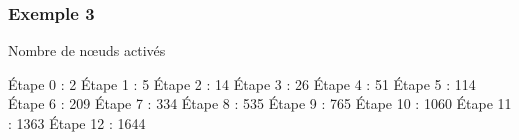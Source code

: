 \documentclass[12pt]{beamer}
\begin{document}
\begin{frame}
\frametitle{Exemple 3}


  \begin{block}{Nombre de n\oe uds activés}
   \begin{overprint}
 Étape 0 : 2
Étape 1 : 5
Étape 2 : 14
Étape 3 : 26
Étape 4 : 51
Étape 5 : 114
Étape 6 : 209
Étape 7 : 334
Étape 8 : 535
Étape 9 : 765
Étape 10 : 1060
Étape 11 : 1363
Étape 12 : 1644

\end{overprint}
  \end{block}

  
  \begin{overlayarea}{8cm}{8cm}

  \end{overlayarea}

  

\end{frame}
\end{document}
